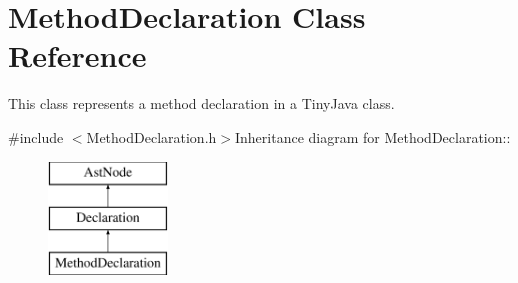 \hypertarget{classMethodDeclaration}{
\section{MethodDeclaration Class Reference}
\label{classMethodDeclaration}
}


This class represents a method declaration in a TinyJava class.  


{\ttfamily \#include $<$MethodDeclaration.h$>$}Inheritance diagram for MethodDeclaration::\begin{figure}[H]
\begin{center}
\leavevmode
\includegraphics[height=3cm]{classMethodDeclaration}
\end{center}
\end{figure}
